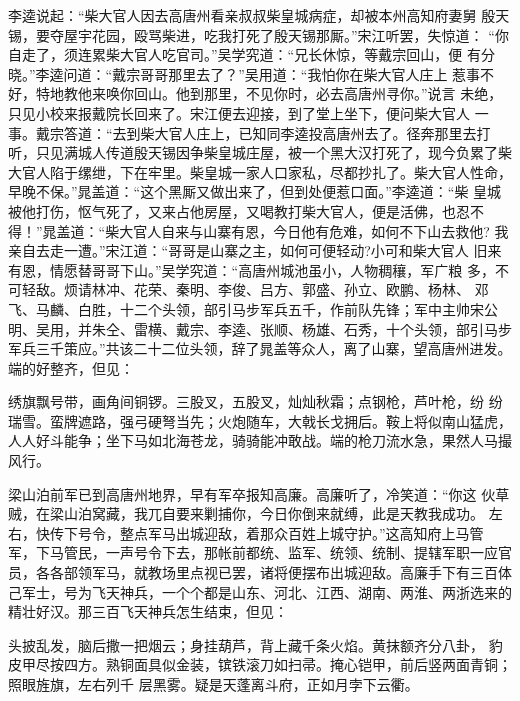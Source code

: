 李逵说起：“柴大官人因去高唐州看亲叔叔柴皇城病症，却被本州高知府妻舅
殷天锡，要夺屋宇花园，殴骂柴进，吃我打死了殷天锡那厮。”宋江听罢，失惊道：
“你自走了，须连累柴大官人吃官司。”吴学究道：“兄长休惊，等戴宗回山，便
有分晓。”李逵问道：“戴宗哥哥那里去了？”吴用道：“我怕你在柴大官人庄上
惹事不好，特地教他来唤你回山。他到那里，不见你时，必去高唐州寻你。”说言
未绝，只见小校来报戴院长回来了。宋江便去迎接，到了堂上坐下，便问柴大官人
一事。戴宗答道：“去到柴大官人庄上，已知同李逵投高唐州去了。径奔那里去打
听，只见满城人传道殷天锡因争柴皇城庄屋，被一个黑大汉打死了，现今负累了柴
大官人陷于缧绁，下在牢里。柴皇城一家人口家私，尽都抄扎了。柴大官人性命，
早晚不保。”晁盖道：“这个黑厮又做出来了，但到处便惹口面。”李逵道：“柴
皇城被他打伤，怄气死了，又来占他房屋，又喝教打柴大官人，便是活佛，也忍不
得！”晁盖道：“柴大官人自来与山寨有恩，今日他有危难，如何不下山去救他?
我亲自去走一遭。”宋江道：“哥哥是山寨之主，如何可便轻动?小可和柴大官人
旧来有恩，情愿替哥哥下山。”吴学究道：“高唐州城池虽小，人物稠穰，军广粮
多，不可轻敌。烦请林冲、花荣、秦明、李俊、吕方、郭盛、孙立、欧鹏、杨林、
邓飞、马麟、白胜，十二个头领，部引马步军兵五千，作前队先锋；军中主帅宋公
明、吴用，并朱仝、雷横、戴宗、李逵、张顺、杨雄、石秀，十个头领，部引马步
军兵三千策应。”共该二十二位头领，辞了晁盖等众人，离了山寨，望高唐州进发。
端的好整齐，但见：

绣旗飘号带，画角间铜锣。三股叉，五股叉，灿灿秋霜；点钢枪，芦叶枪，纷
纷瑞雪。蛮牌遮路，强弓硬弩当先；火炮随车，大戟长戈拥后。鞍上将似南山猛虎，
人人好斗能争；坐下马如北海苍龙，骑骑能冲敢战。端的枪刀流水急，果然人马撮
风行。

梁山泊前军已到高唐州地界，早有军卒报知高廉。高廉听了，冷笑道：“你这
伙草贼，在梁山泊窝藏，我兀自要来剿捕你，今日你倒来就缚，此是天教我成功。
左右，快传下号令，整点军马出城迎敌，着那众百姓上城守护。”这高知府上马管
军，下马管民，一声号令下去，那帐前都统、监军、统领、统制、提辖军职一应官
员，各各部领军马，就教场里点视已罢，诸将便摆布出城迎敌。高廉手下有三百体
己军士，号为飞天神兵，一个个都是山东、河北、江西、湖南、两淮、两浙选来的
精壮好汉。那三百飞天神兵怎生结束，但见：

头披乱发，脑后撒一把烟云；身挂葫芦，背上藏千条火焰。黄抹额齐分八卦，
豹皮甲尽按四方。熟铜面具似金装，镔铁滚刀如扫帚。掩心铠甲，前后竖两面青铜；
照眼旌旗，左右列千
层黑雾。疑是天蓬离斗府，正如月孛下云衢。

